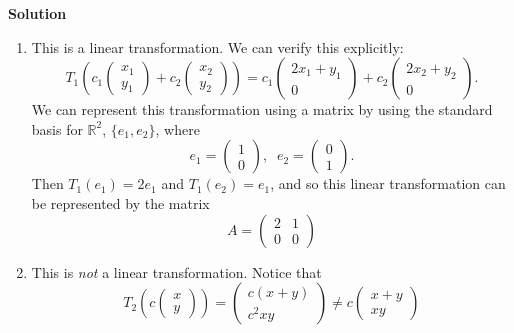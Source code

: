 \documentclass[11pt]{article}
\begin{document}
\noindent \textbf{Solution}\\
\begin{enumerate}
\item This is a linear transformation. We can verify this explicitly: 
$$T_1\left(c_1\begin{pmatrix} x_1 \\ y_1 \end{pmatrix} + c_2\begin{pmatrix} x_2 \\ y_2 \end{pmatrix}\right) = c_1 \begin{pmatrix} 2x_1 + y_1 \\ 0 \end{pmatrix} +  c_2 \begin{pmatrix} 2x_2 + y_2 \\ 0 \end{pmatrix}.$$
We can represent this transformation using a matrix by using the standard basis for $\mathbb{R}^2$, $\{e_1,e_2\}$, where
$$e_1 = \begin{pmatrix} 1 \\ 0 \end{pmatrix}, \;\; e_2 = \begin{pmatrix} 0 \\ 1 \end{pmatrix}.$$
Then $T_1(e_1) = 2e_1$ and $T_1(e_2) = e_1$, and so this linear transformation can be represented by the matrix
$$A = \begin{pmatrix} 2 & 1 \\ 0 & 0 \end{pmatrix}$$

\item This is \emph{not} a linear transformation. Notice that
$$T_2\left(c \begin{pmatrix} x \\ y \end{pmatrix} \right) = \begin{pmatrix} c (x+y) \\ c^2xy \end{pmatrix} \neq c  \begin{pmatrix} x+y \\ xy \end{pmatrix}$$


\end{enumerate}
\end{document}
